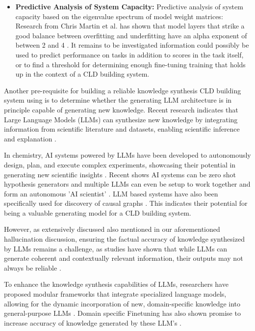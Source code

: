 \begin{itemize}
    \item \textbf{Predictive Analysis of System Capacity:} Predictive analysis of system capacity based on the eigenvalue spectrum of model weight matrices: Research from Chris Martin et al. has shown that model layers that strike a good balance between overfitting and underfitting have an alpha exponent of between 2 and 4 \cite{martin2021predicting} \cite{martin2019traditional} \cite{martin2021predicting}. It remains to be investigated information could possibly be used to predict performance on tasks in addition to scores in the task itself, or to find a threshold for determining enough fine-tuning training that holds up in the context of a CLD building system.
\end{itemize}

Another pre-requisite for building a reliable knowledge synthesis CLD building system using is to determine whether the generating LLM architecture is in principle capable of generating new knowledge.  Recent research indicates that Large Language Models (LLMs) can synthesize new knowledge by integrating information from scientific literature and datasets, enabling scientific inference and explanation \cite{Zheng2023}.

In chemistry, AI systems powered by LLMs have been developed to autonomously design, plan, and execute complex experiments, showcasing their potential in generating new scientific insights \cite{Feng2023}. Recent shows AI systems can be zero shot hypothesis generators \cite{Qi2023} and multiple LLMs can even be setup to work together and form an autonomous 'AI scientist' \cite{lu2024ai}. LLM based systems have also been specifically used for discovery of causal graphs \cite{zhang2024causal}. This indicates their potential for being a valuable generating model for a CLD building system.

However, as extensively discussed also mentioned in our aforementioned hallucination discussion, ensuring the factual accuracy of knowledge synthesized by LLMs remains a challenge, as studies have shown that while LLMs can generate coherent and contextually relevant information, their outputs may not always be reliable \cite{Wang2024}.

To enhance the knowledge synthesis capabilities of LLMs, researchers have proposed modular frameworks that integrate specialized language models, allowing for the dynamic incorporation of new, domain-specific knowledge into general-purpose LLMs \cite{Qi2023}. Domain specific Finetuning has also shown promise to increase accuracy of knowledge generated by these LLM's \cite{Susnjak2024}.

